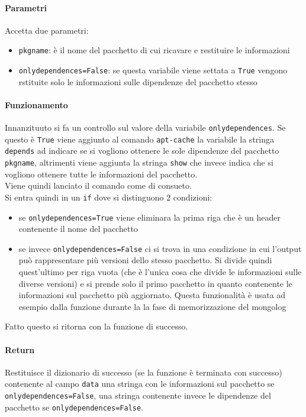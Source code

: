 \documentclass[11pt]{article}
\begin{document}
\paragraph{Parametri}
Accetta due parametri:
\begin{itemize}
	\item{\texttt{pkgname}: è il nome del pacchetto di cui ricavare e restituire le informazioni}
	\item{\texttt{onlydependences=False}: se questa variabile viene settata a \texttt{True} vengono rstituite
		solo le informazioni sulle dipendenze del pacchetto stesso}
\end{itemize}
\paragraph{Funzionamento}
Innanzituuto si fa un controllo sul valore della variabile \texttt{onlydependences}. Se questo è \texttt{True} viene
aggiunto al comando \texttt{apt-cache} la variabile la stringa \texttt{depends} ad indicare se si vogliono ottenere
le sole dipendenze del pacchetto \texttt{pkgname}, altrimenti viene aggiunta la stringa \texttt{show} che invece
indica che si vogliono ottenere tutte le informazioni del pacchetto.\\
Viene quindi lanciato il comando come di consueto.\\
Si entra quindi in un \texttt{if} dove si distinguono 2 condizioni:
\begin{itemize}
	\item{se \texttt{onlydependences=True} viene eliminara la prima riga che è un header contenente
		il nome del pacchetto}
	\item{se invece \texttt{onlydependences=False} ci si trova in una condizione in cui l'output può
		rappresentare più versioni dello stesso pacchetto. Si divide quindi quest'ultimo per riga vuota
		(che è l'unica cosa che divide le informazioni sulle diverse versioni) e si prende solo il
		primo pacchetto in quanto contenente le informazioni sul pacchetto più aggiornato.
		Questa funzionalità è usata ad esempio dalla funzione  durante la
		la fase di memorizzazione del mongolog}
\end{itemize}
Fatto questo si ritorna con la funzione di successo.
\paragraph{Return}
Restituisce il dizionario di successo (se la funzione è terminata con successo) contenente al campo \texttt{data}
una stringa con le informazioni sul pacchetto se \texttt{onlydependences=False}, una stringa contenente invece
le dipendenze del pacchetto se \texttt{onlydependences=False}.
\end{document}
